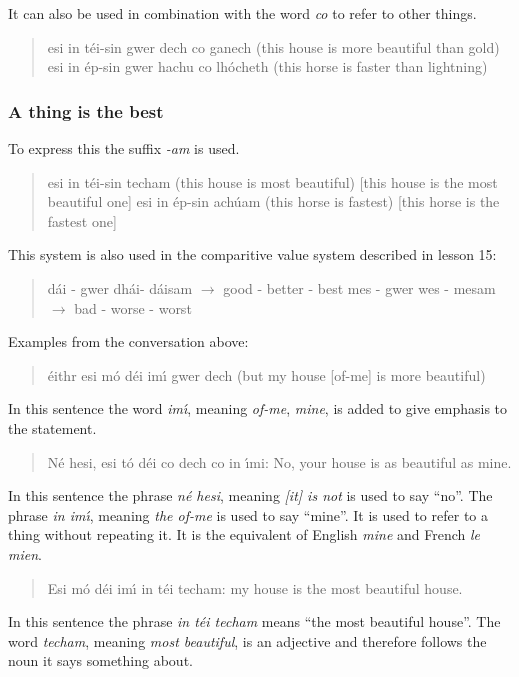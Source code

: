 It can also be used in combination with the word \textit{co} to refer to other things.

\begin{quote}
esi in t\'{e}i-sin gwer dech co ganech (this house is more beautiful than gold)
esi in \'{e}p-sin gwer hachu co lh\'{o}cheth (this horse is faster than lightning)
\end{quote}

\subsubsection{A thing is the best}

To express this the suffix \textit{-am} is used.

\begin{quote}
esi in t\'{e}i-sin techam (this house is most beautiful) [this house is the most beautiful one]
esi in \'{e}p-sin ach\'{u}am (this horse is fastest) [this horse is the fastest one]
\end{quote}

This system is also used in the comparitive value system described in lesson 15:

\begin{quote}
d\'{a}i - gwer dh\'{a}i- d\'{a}isam $\rightarrow$ good - better - best
mes - gwer wes - mesam $\rightarrow$ bad - worse - worst
\end{quote}

Examples from the conversation above:

\begin{quote}
\'{e}ithr esi m\'{o} d\'{e}i im\'{\i} gwer dech (but my house [of-me] is more beautiful)
\end{quote}
In this sentence the word \textit{im\'{\i}}, meaning \textit{of-me}, \textit{mine}, is added to give emphasis to the statement.

\begin{quote}
N\'{e} hesi, esi t\'{o} d\'{e}i co dech co in \'{\i}mi: No, your house is as beautiful as mine.
\end{quote}
In this sentence the phrase \textit{n\'{e} hesi}, meaning \textit{[it] is not} is used to say ``no''.
The phrase \textit{in im\'{\i}}, meaning \textit{the of-me} is used to say ``mine''. It is used to refer to a thing without repeating it. It is the equivalent of English \textit{mine} and French \textit{le mien}.

\begin{quote}
Esi m\'{o} d\'{e}i im\'{\i} in t\'{e}i techam: my house is the most beautiful house.
\end{quote}
In this sentence the phrase \textit{in t\'{e}i techam} means ``the most beautiful house''. The word \textit{techam}, meaning \textit{most beautiful}, is an adjective and therefore follows the noun it says something about.

